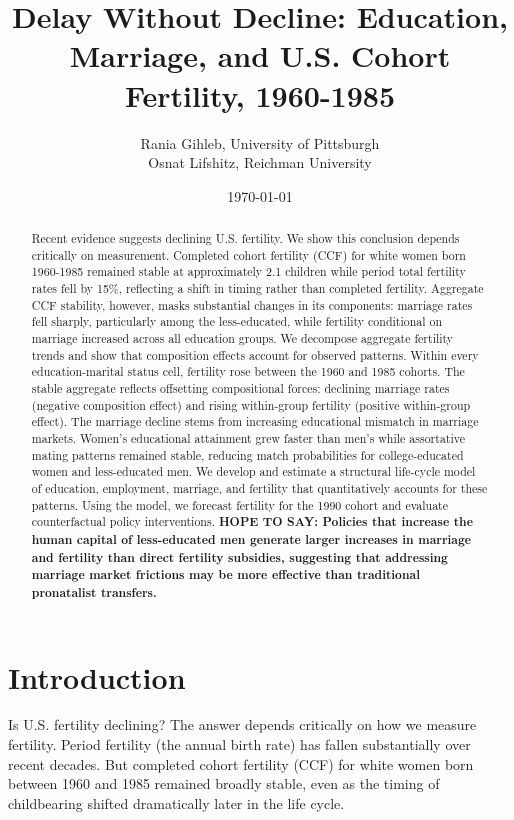 \documentclass[12pt]{article}
\title{Delay Without Decline: Education, Marriage, and U.S. Cohort Fertility, 1960-1985}
\author{Rania Gihleb, University of Pittsburgh\\Osnat Lifshitz, Reichman University }
\date{\today}
\begin{document}
\maketitle
\begin{abstract}
\indent Recent evidence suggests declining U.S. fertility. We show this conclusion depends critically on measurement. Completed cohort fertility (CCF) for white women born 1960-1985 remained stable at approximately 2.1 children while period total fertility rates fell by 15\%, reflecting a shift in timing rather than completed fertility. Aggregate CCF stability, however, masks substantial changes in its components: marriage rates fell sharply, particularly among the less-educated, while fertility conditional on marriage increased across all education groups. We decompose aggregate fertility trends and show that composition effects account for observed patterns. Within every education-marital status cell, fertility rose between the 1960 and 1985 cohorts. The stable aggregate reflects offsetting compositional forces: declining marriage rates (negative composition effect) and rising within-group fertility (positive within-group effect). The marriage decline stems from increasing educational mismatch in marriage markets. Women's educational attainment grew faster than men's while assortative mating patterns remained stable, reducing match probabilities for college-educated women and less-educated men. We develop and estimate a structural life-cycle model of education, employment, marriage, and fertility that quantitatively accounts for these patterns. Using the model, we forecast fertility for the 1990 cohort and evaluate counterfactual policy interventions. \textbf{HOPE TO SAY: Policies that increase the human capital of less-educated men generate larger increases in marriage and fertility than direct fertility subsidies, suggesting that addressing marriage market frictions may be more effective than traditional pronatalist transfers.}
\end{abstract}



\doublespacing

\section{Introduction}

Is U.S. fertility declining? The answer depends critically on how we measure fertility. Period fertility (the annual birth rate) has fallen substantially over recent decades. But completed cohort fertility (CCF) for white women born between 1960 and 1985 remained broadly stable, even as the timing of childbearing shifted dramatically later in the life cycle.
\end{document}
